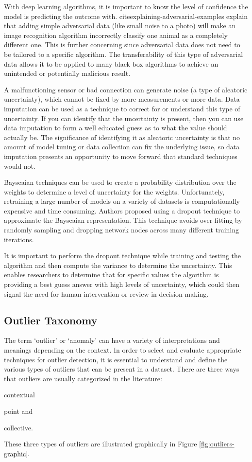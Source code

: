 With deep learning algorithms, it is important to know the level of confidence the model is predicting the outcome with. cite{explaining-adversarial-examples} explain that adding simple adversarial data (like small noise to a photo) will make an image recognition algorithm incorrectly classify one animal as a completely different one. This is further concerning since adversarial data does not need to be tailored to a specific algorithm. The transferability of this type of adversarial data allows it to be applied to many black box algorithms to achieve an unintended or potentially malicious result. 

A malfunctioning sensor or bad connection can generate noise (a type of aleatoric uncertainty), which cannot be fixed by more measurements or more data. Data imputation can be used as a technique to correct for or understand this type of uncertainty. If you can identify that the uncertainty is present, then you can use data imputation to form a well educated guess as to what the value should actually be. The significance of identifying it as aleatoric uncertainty is that no amount of model tuning or data collection can fix the underlying issue, so data imputation presents an opportunity to move forward that standard techniques would not.

Bayseaian techniques can be used to create a probability distribution over the weights to determine a level of uncertainty for the weights. Unfortunately, retraining a large number of models on a variety of datasets is computationally expensive and time consuming. Authors \cite{gal2016dropout} proposed using a dropout technique to approximate the Bayseaian representation. This technique avoids over-fitting by randomly sampling and dropping network nodes across many different training iterations.

It is important to perform the dropout technique while training and testing the algorithm and then compute the variance to determine the uncertainty. This enables researchers to determine that for specific values the algorithm is providing a best guess answer with high levels of uncertainty, which could then signal the need for human intervention or review in decision making.  

\subsection{Outlier Taxonomy}

The term `outlier' or `anomaly' can have a variety of interpretations and meanings depending on the context. In order to select and evaluate appropriate techniques for outlier detection, it is essential to understand and define the various types of outliers that can be present in a dataset. There are three ways that outliers are usually categorized in the literature:
\begin{inlinelist}
    \item contextual
    \item point and
    \item collective.
\end{inlinelist}
These three types of outliers are illustrated graphically in Figure \ref{fig:outliers-graphic}.

